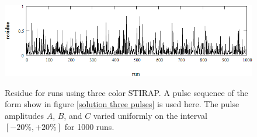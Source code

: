 \begin{figure}
\includegraphics[width=6.00in]
{three_STIRAP/three_STIRAP.png}\\
\caption[Residue for runs using three color STIRAP]{Residue for runs using three color STIRAP. A pulse sequence of the form show in figure \ref{solution three pulses} is used here. The pulse amplitudes $A$, $B$, and $C$ varied uniformly on the interval $[-20\%,+20\%]$ for 1000 runs.}
\label{three color optimum}
\end{figure} 
